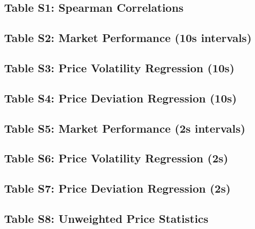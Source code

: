 \documentclass[11pt]{article}
\begin{document}
\subsection{Table S1: Spearman Correlations}

\clearpage

\subsection{Table S2: Market Performance (10s intervals)}

\clearpage

\subsection{Table S3: Price Volatility Regression (10s)}

\clearpage

\subsection{Table S4: Price Deviation Regression (10s)}

\clearpage

\subsection{Table S5: Market Performance (2s intervals)}

\clearpage

\subsection{Table S6: Price Volatility Regression (2s)}

\clearpage

\subsection{Table S7: Price Deviation Regression (2s)}

\clearpage

\subsection{Table S8: Unweighted Price Statistics}

\clearpage

\end{document}
